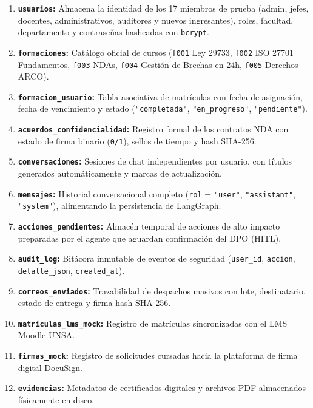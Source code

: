 \documentclass[11pt,a4paper]{article}
\begin{document}
\begin{enumerate}
    \item \textbf{\texttt{usuarios}:} Almacena la identidad de los 17 miembros de prueba (admin, jefes, docentes, administrativos, auditores y nuevos ingresantes), roles, facultad, departamento y contraseñas hasheadas con \texttt{bcrypt}.
    \item \textbf{\texttt{formaciones}:} Catálogo oficial de cursos (\texttt{f001} Ley 29733, \texttt{f002} ISO 27701 Fundamentos, \texttt{f003} NDAs, \texttt{f004} Gestión de Brechas en 24h, \texttt{f005} Derechos ARCO).
    \item \textbf{\texttt{formacion\_usuario}:} Tabla asociativa de matrículas con fecha de asignación, fecha de vencimiento y estado (\texttt{"completada"}, \texttt{"en\_progreso"}, \texttt{"pendiente"}).
    \item \textbf{\texttt{acuerdos\_confidencialidad}:} Registro formal de los contratos NDA con estado de firma binario (\texttt{0/1}), sellos de tiempo y hash SHA-256.
    \item \textbf{\texttt{conversaciones}:} Sesiones de chat independientes por usuario, con títulos generados automáticamente y marcas de actualización.
    \item \textbf{\texttt{mensajes}:} Historial conversacional completo (\texttt{rol} = \texttt{"user"}, \texttt{"assistant"}, \texttt{"system"}), alimentando la persistencia de LangGraph.
    \item \textbf{\texttt{acciones\_pendientes}:} Almacén temporal de acciones de alto impacto preparadas por el agente que aguardan confirmación del DPO (HITL).
    \item \textbf{\texttt{audit\_log}:} Bitácora inmutable de eventos de seguridad (\texttt{user\_id}, \texttt{accion}, \texttt{detalle\_json}, \texttt{created\_at}).
    \item \textbf{\texttt{correos\_enviados}:} Trazabilidad de despachos masivos con lote, destinatario, estado de entrega y firma hash SHA-256.
    \item \textbf{\texttt{matriculas\_lms\_mock}:} Registro de matrículas sincronizadas con el LMS Moodle UNSA.
    \item \textbf{\texttt{firmas\_mock}:} Registro de solicitudes cursadas hacia la plataforma de firma digital DocuSign.
    \item \textbf{\texttt{evidencias}:} Metadatos de certificados digitales y archivos PDF almacenados físicamente en disco.
\end{enumerate}
\end{document}

